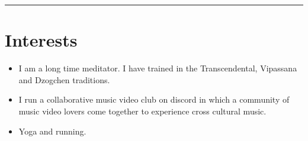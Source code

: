 \documentclass[12pt]{IEEEtran}
\newcommand{\cvrule}{\noindent\rule{8.5cm}{0.4pt}}
\begin{document}
\cvrule
\vskip 0.35in
\section*{I\textbf{nterests}}

\begin{itemize}
\item I am a long time meditator. I have trained in the Transcendental, Vipassana and Dzogchen traditions.
\item I run a collaborative music video club on discord in which a community of music video lovers come together to experience cross cultural music.
\iffalse
\item I play music regularly (Grade 8 in Baroque Recorder).
\fi
\item Yoga and running.
\end{itemize}
\end{document}
